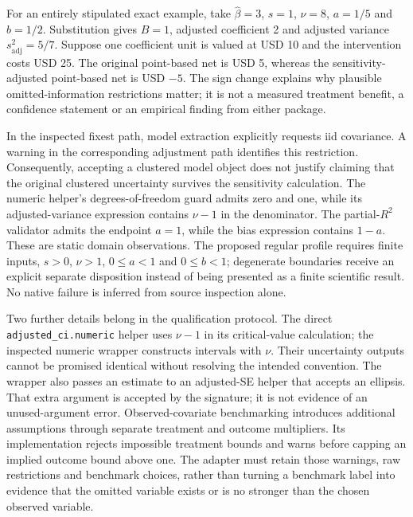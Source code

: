 For an entirely stipulated exact example, take $\widehat\beta=3$, $s=1$,
$\nu=8$, $a=1/5$ and $b=1/2$. Substitution gives $B=1$, adjusted coefficient
2 and adjusted variance $s_{\mathrm{adj}}^2=5/7$. Suppose one coefficient
unit is valued at USD 10 and the intervention costs USD 25. The original
point-based net is USD 5, whereas the sensitivity-adjusted point-based net
is USD $-5$. The sign change explains why plausible omitted-information
restrictions matter; it is not a measured treatment benefit, a confidence
statement or an empirical finding from either package.
\citep{exec23_sensitivity_reference}

In the inspected fixest path, model extraction explicitly requests iid
covariance. A warning in the corresponding adjustment path identifies this
restriction. Consequently, accepting a clustered model object does not justify
claiming that the original clustered uncertainty survives the sensitivity
calculation. The numeric helper's degrees-of-freedom guard admits zero and
one, while its adjusted-variance expression contains $\nu-1$ in the denominator.
The partial-$R^2$ validator admits the endpoint $a=1$, while the bias expression
contains $1-a$. These are static domain observations. The proposed regular
profile requires finite inputs, $s>0$, $\nu>1$, $0\leq a<1$ and $0\leq b<1$;
degenerate boundaries receive an explicit separate disposition instead of
being presented as a finite scientific result. No native failure is inferred
from source inspection alone.
\citep{exec23_sensitivity_sensemakr}

Two further details belong in the qualification protocol. The direct
\texttt{adjusted\_ci.numeric} helper uses $\nu-1$ in its critical-value
calculation; the inspected numeric wrapper constructs intervals with $\nu$.
Their uncertainty outputs cannot be promised identical without resolving the
intended convention. The wrapper also passes an estimate to an adjusted-SE
helper that accepts an ellipsis. That extra argument is accepted by the
signature; it is not evidence of an unused-argument error. Observed-covariate
benchmarking introduces additional assumptions through separate treatment and
outcome multipliers. Its implementation rejects impossible treatment bounds
and warns before capping an implied outcome bound above one. The adapter must
retain those warnings, raw restrictions and benchmark choices, rather than
turning a benchmark label into evidence that the omitted variable exists or
is no stronger than the chosen observed variable.
\citep{exec23_sensitivity_sensemakr}

